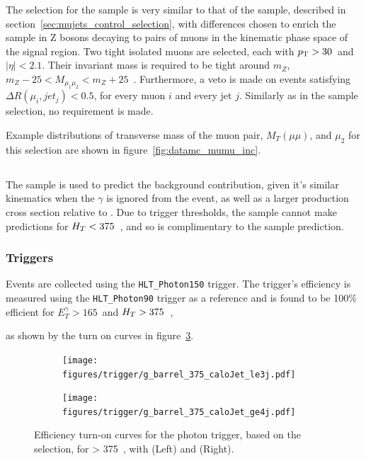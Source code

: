 The selection for the \mmj sample is very similar to that of the \mj sample, 
described in section~\ref{sec:mujets_control_selection}, with differences chosen
to enrich the sample in Z bosons decaying to pairs of muons in the kinematic 
phase space of the signal region. Two tight isolated muons are selected, each 
with ${p_{\text T}} > 30$~\gev and $|\eta| < 2.1$. Their invariant mass is required to be
tight around $m_Z$, $m_Z - 25 < M_{\mu_1\mu_2} < m_Z + 25$~\gev. Furthermore, a 
veto is made on events satisfying $\Delta R(\mu_i, jet_j) < 0.5$, for every muon 
$i$ and every jet $j$. Similarly as in the \mj sample selection, no \alphat
requirement is made.

Example distributions of transverse mass of the muon pair, $M_T(\mu\mu)$, and
$\mu_2$ \Pt for this selection are shown in figure~\ref{fig:datamc_mumu_inc}.

\subsection{\gj}
\label{sec:gjets_control_sample}
The \gj sample is used to predict the \zinv background contribution, given it's 
similar kinematics when the $\gamma$ is ignored from the event, as well as a
larger
production cross section relative to \mmj. Due to trigger thresholds, the \gj
sample cannot make predictions for $H_T<375$~\gev, and so is complimentary to
the \mmj sample prediction.

\subsubsection{Triggers}
Events are collected using the \verb!HLT_Photon150! trigger. The trigger's 
efficiency is measured using the \verb!HLT_Photon90! trigger as a reference and
is found to be 100$\%$ efficient for $E_T^{\gamma}>165$~\gev and $H_T>375$~\gev,

as shown by the turn on curves in figure~\ref{fig:photon_control_trigeff}.

\begin{figure}[ht!]
  \centering
  \begin{subfigure}[b]{0.35\textwidth}
    \texttt{[image: figures/trigger/g\_barrel\_375\_caloJet\_le3j.pdf]}
    \caption{\njlow}
    \label{fig:photon_control_trigeff_le3j}
  \end{subfigure}
  \begin{subfigure}[b]{0.35\textwidth}
    \texttt{[image: figures/trigger/g\_barrel\_375\_caloJet\_ge4j.pdf]}
    \caption{\njhigh}
    \label{fig:photon_control_trigeff_ge4j}
  \end{subfigure}
  \caption{Efficiency turn-on curves for the photon trigger, based on the \gj 
  selection, for \HT > 375~\gev, with \njlow (Left) and \njhigh(Right).}
  \label{fig:photon_control_trigeff}
\end{figure}

